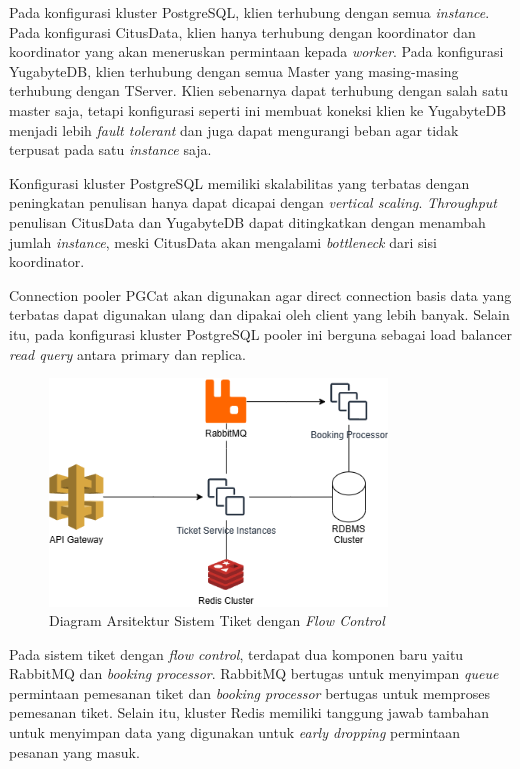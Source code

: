 Pada konfigurasi kluster PostgreSQL, klien terhubung dengan semua \textit{instance}. Pada konfigurasi CitusData, klien hanya terhubung dengan koordinator dan koordinator yang akan meneruskan permintaan kepada \textit{worker}. Pada konfigurasi YugabyteDB, klien terhubung dengan semua Master yang masing-masing terhubung dengan TServer. Klien sebenarnya dapat terhubung dengan salah satu master saja, tetapi konfigurasi seperti ini membuat koneksi klien ke YugabyteDB menjadi lebih \textit{fault tolerant} dan juga dapat mengurangi beban agar tidak terpusat pada satu \textit{instance} saja.

Konfigurasi kluster PostgreSQL memiliki skalabilitas yang terbatas dengan peningkatan penulisan hanya dapat dicapai dengan \textit{vertical scaling}. \textit{Throughput} penulisan CitusData dan YugabyteDB dapat ditingkatkan dengan menambah jumlah \textit{instance}, meski CitusData akan mengalami \textit{bottleneck} dari sisi koordinator.

Connection pooler PGCat akan digunakan agar direct connection basis data yang terbatas dapat digunakan ulang dan dipakai oleh client yang lebih banyak. Selain itu, pada konfigurasi kluster PostgreSQL pooler ini berguna sebagai load balancer \textit{read query} antara primary dan replica.

\begin{figure}[htbp]
    \centering
    \includegraphics[width=0.8\textwidth]{resources/chapter-3/ticket-fc.png}
    \caption{Diagram Arsitektur Sistem Tiket dengan \textit{Flow Control}}
    \label{fig:ticket-fc}
\end{figure}

Pada sistem tiket dengan \textit{flow control}, terdapat dua komponen baru yaitu RabbitMQ dan \textit{booking processor}. RabbitMQ bertugas untuk menyimpan \textit{queue} permintaan pemesanan tiket dan \textit{booking processor} bertugas untuk memproses pemesanan tiket. Selain itu, kluster Redis memiliki tanggung jawab tambahan untuk menyimpan data yang digunakan untuk \textit{early dropping} permintaan pesanan yang masuk.

